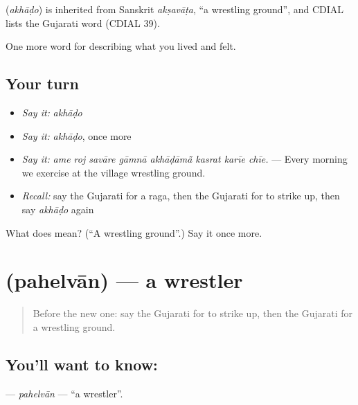 \begin{cousinweb}
\textbf{} (\emph{akhāḍo}) is inherited from Sanskrit \emph{akṣavāṭa}, \textquotedblleft{}a wrestling ground\textquotedblright{}, and CDIAL lists the Gujarati word (CDIAL 39).
\end{cousinweb}

\begin{grammarlens}[title={What you've built}]
One more word for describing what you lived and felt.
\end{grammarlens}

\subsection*{Your turn}
\begin{itemize}
\raggedright
  \item \emph{Say it:} \emph{akhāḍo}
  \item \emph{Say it:} \emph{akhāḍo}, once more
  \item \emph{Say it:} \emph{ame roj savāre gāmnā akhāḍāmā̃ kasrat karīe chīe.} — Every morning we exercise at the village wrestling ground.
  \item \emph{Recall:} say the Gujarati for a raga, then the Gujarati for to strike up, then say \emph{akhāḍo} again
\end{itemize}

\begin{tcolorbox}[breakable,colback=teal!4,colframe=teal!35!black,title={Before you move on}]
What does  mean? (\textquotedblleft{}A wrestling ground\textquotedblright{}.) Say it once more.
\end{tcolorbox}
\section[\texorpdfstring{\gu{પહેલવાન} (pahelvān)}{પહેલવાન (pahelvān)}]{ (pahelvān) — a wrestler}

\label{lesson:GU-C527-pahelvan}



\begin{quote}
Before the new one: say the Gujarati for to strike up, then the Gujarati for a wrestling ground.
\end{quote}

\subsection*{You'll want to know: }
\textbf{} — \emph{pahelvān} — \textquotedblleft{}a wrestler\textquotedblright{}.

